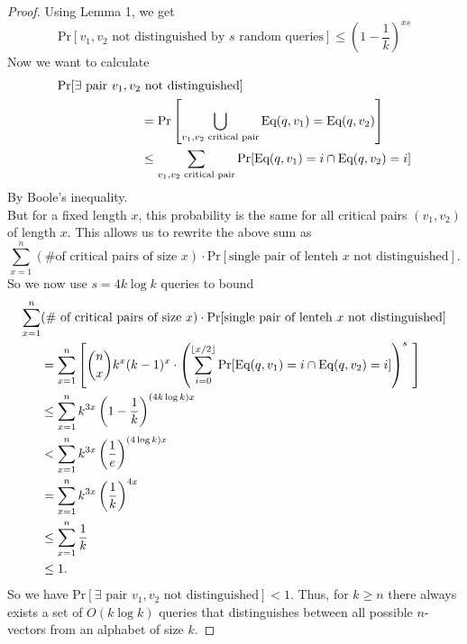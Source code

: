 \documentclass[12pt, a4paper]{article}
\begin{document}
\begin{proof}
    Using Lemma 1, we get 
	\begin{equation*}
	\text{Pr}[v_1,v_2 \text{ not distinguished by $s$ random queries}] \leq \left(1-\frac{1}{k}\right)^{xs}
	\end{equation*}
Now we want to calculate
    	\begin{align*}
		\text{Pr}[\exists\text{ pair } v_1, v_2 & \text{ not distinguished}]\\
	& = \text{Pr}\left[\bigcup_{v_1,v_2 \text{ critical pair}} \textnormal{Eq}(q,v_1) =
    	\textnormal{Eq}(q,v_2)\right] \\
	& \le \sum_{v_1,v_2 \text{ critical pair}} \textnormal{Pr}[\textnormal{Eq}(q,v_1) = i
    	\cap\textnormal{Eq}(q,v_2) = i] 
	\end{align*}
By Boole's inequality. \\
 But for a fixed length $x$, this probability is the same for all critical pairs $(v_1,v_2)$ of length $x$. This
allows us to rewrite the above sum as
\begin{equation*}
    	\sum_{x=1}^n(\text{\# of critical pairs of size }x)
		\cdot\text{Pr}[\text{single pair of lenteh $x$ not distinguished}].
\end{equation*}
So we now use $s = 4k \log k$ queries to bound
	\begin{align*}
    	\sum_{x=1}^n&(\text{\# of critical pairs of size }x)
		\cdot\text{Pr}[\text{single pair of lenteh $x$ not distinguished}]\\
        & = \sum_{x=1}^n \left[\binom{n}{x}k^x(k-1)^x
        \cdot\left(\sum_{i=0}^{\left\lfloor x/2 \right\rfloor}
		\textnormal{Pr}[\textnormal{Eq}(q,v_1) = i
    	\cap\textnormal{Eq}(q,v_2) = i]\right)^s ~\right]\\
        &\le \sum_{x=1}^n k^{3x} \left(1-\frac{1}{k}\right)^{(4k\log k)x} \\
        &< \sum_{x=1}^n k^{3x} \left(\frac{1}{e}\right)^{(4\log k)x} \\
        &= \sum_{x=1}^n k^{3x} \left(\frac{1}{k}\right)^{4 x} \\
        &\le \sum_{x=1}^n \frac{1}{k} \\
        &\le 1.
        \end{align*}
    So we have $\text{Pr}[\exists\text{ pair } v_1, v_2  \text{ not distinguished}] < 1$. Thus, for $k\ge n$ there always exists a set of $O(k\log k)$ queries that
    distinguishes between all possible $n$-vectors from an alphabet of size $k$.
\end{proof}
\end{document}
